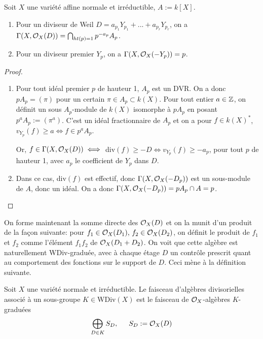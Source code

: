 \begin{prop}
Soit $X$ une variété affine normale et irréductible, $A:=k[X]$. 
\begin{enumerate}
\item Pour un diviseur de Weil $D=a_{p_1}Y_{p_1}+...+a_{p_r}Y_{p_r}$, on a $\Gamma(X,\mathcal{O}_X(D))=\bigcap_{ht(p)=1}p^{-a_p}A_p$.
\item Pour un diviseur premier $Y_p$, on a $\Gamma(X,\mathcal{O}_X(-Y_p))=p$.
\end{enumerate}
\end{prop}
\begin{proof}
\begin{enumerate}
\item Pour tout idéal premier $p$ de hauteur 1, $A_p$ est un DVR. On a donc $pA_p=(\pi)$ pour un certain $\pi \in A_p\subset k(X)$. Pour tout entier $a\in \mathbb{Z}$, on définit un sous $A_p$-module de $k(X)$ isomorphe à $pA_p$ en posant $p^aA_p:= (\pi^a)$. C'est un idéal fractionnaire de $A_p$ et on a pour $f\in k(X)^*$, $v_{Y_p}(f)\geq a \iff f\in p^a A_p$.

Or, $f\in \Gamma(X,\mathcal{O}_X(D)) \iff $ div$(f)\geq -D \iff v_{Y_p}(f)\geq -a_p$, pour tout $p$ de hauteur 1, avec $a_p$ le coefficient de $Y_p$ dans $D$.
\item Dans ce cas, div$(f)$ est effectif, donc $\Gamma(X,\mathcal{O}_X(-D_p))$ est un sous-module de $A$, donc un idéal. On a donc $\Gamma(X,\mathcal{O}_X(-D_p))=pA_p\cap A=p$.
\end{enumerate}
\end{proof}

On forme maintenant la somme directe des $\mathcal{O}_X(D)$ et on la munit d'un produit de la façon suivante: pour $f_1\in \mathcal{O}_X(D_1),\, f_2\in \mathcal{O}_X(D_2)$, on définit le produit de $f_1$ et $f_2$ comme l'élément $f_1f_2$ de $\mathcal{O}_X(D_1+D_2)$. On voit que cette algèbre est naturellement WDiv-graduée, avec à chaque étage $D$ un contrôle prescrit quant au comportement des fonctions sur le support de $D$. Ceci mène à la définition suivante.

\begin{defn}
Soit $X$ une variété normale et irréductible. Le faisceau d'algèbres divisorielles associé à un sous-groupe $K\in $WDiv$(X)$ est le faisceau de $\mathcal{O}_X$-algèbres $K$-graduées $$\bigoplus_{D\in K}S_D,\,\,\,\,\,\,\,\,\, S_D:=\mathcal{O}_X(D)$$ 
\end{defn}

